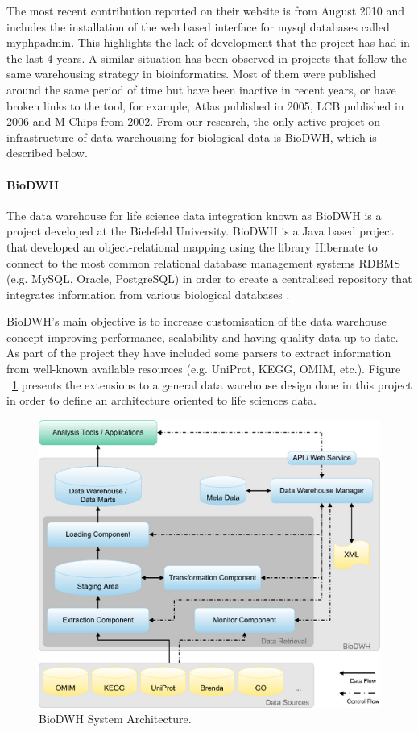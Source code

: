 The most recent contribution reported on their website is from August 2010 and includes the installation of the web based interface for mysql databases called myphpadmin. This highlights the lack of development that the project has had in the last 4 years. A similar situation has been observed in projects that follow the same warehousing strategy in bioinformatics. Most of them were published around the same period of time but have been inactive in recent years, or have broken links to the tool, for example, Atlas \cite{SHA2005} published in 2005, LCB\cite{AME2006} published in 2006 and M-Chips \cite{FEL2002} from 2002. From our research, the only active project on infrastructure of data warehousing for biological data is BioDWH, which is described below.

\paragraph{BioDWH}
The data warehouse for life science data integration known as BioDWH is a project developed at the Bielefeld University. BioDWH is a Java based project that developed an object-relational mapping using the library Hibernate to connect to the most common relational database management systems RDBMS (e.g. MySQL, Oracle, PostgreSQL) in order to create a centralised repository that integrates information from various biological databases \cite{TOP2008}.

BioDWH's main objective is to increase customisation of the data warehouse concept improving performance, scalability and having quality data up to date. As part of the project they have included some parsers to extract information from well-known available resources (e.g. UniProt, KEGG, OMIM, etc.). Figure ~\ref{fig:biodwh} presents the extensions to a general data warehouse design done in this project in order to define an architecture oriented to life sciences data.

\begin{figure}  
\centering
\includegraphics[width=4.5in]{figures/dwh_architecture.png}
\caption[BioDWH System Architecture.]{BioDWH System Architecture.
\label{fig:biodwh}}
\end{figure}

